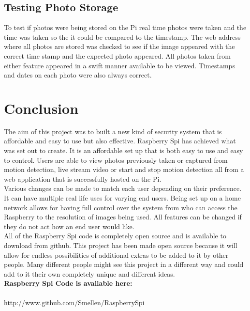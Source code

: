 \documentclass[]{report}
\begin{document}
\section{Testing Photo Storage}
\label{sec:photoStorageTest}
%
To test if photos were being stored on the Pi real time photos were taken and the time was taken  so the it could be compared to the timestamp. The web address where all photos are stored was checked to see if the image appeared with the correct time stamp and the expected photo appeared. All photos taken from either feature appeared in a swift manner available to be viewed. Timestamps and dates on each photo were also always correct.\\


\chapter{Conclusion}
\label{ch:concl}
%
%
%
%
The aim of this project was to built a new kind of security system that is affordable and easy to use but also effective. Raspberry Spi has achieved what was set out to create. It is an affordable set up that is both easy to use and easy to control. Users are able to view photos previously taken or captured from motion detection, live stream video or start and stop motion detection all from a web application that is successfully hosted on the Pi. \\

Various changes can be made to match each user depending on their preference. It can have multiple real life uses for varying end users. Being set up on a home network allows for having full control over the system from who can access the Raspberry to the resolution of images being used. All features can be changed if they do not act how an end user would like.\\

All of the Raspberry Spi code is completely open source and is available to download from github. This project has been made open source because it will allow for endless possibilities of additional extras to be added to it by other people. Many different people might see this project in a different way and could add to it their own completely unique and different ideas.\\
\noindent
{\bf Raspberry Spi Code is available here:}\\
{\\http://www.github.com/Smellen/RaspberrySpi}
\end{document}
